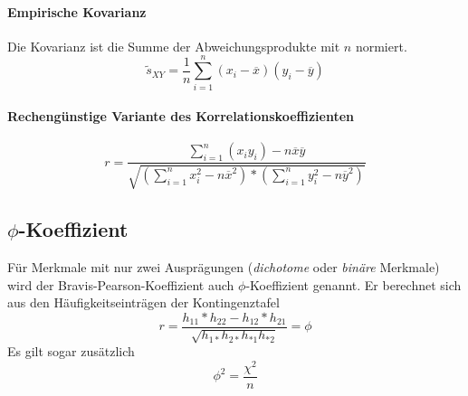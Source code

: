 \paragraph{Empirische Kovarianz}
Die Kovarianz ist die Summe der Abweichungsprodukte mit $n$ normiert.
\begin{equation*}
	\tilde s_{XY}=\frac1n\sum\limits_{i=1}^n (x_i-\overline x)(y_i-\overline y)
\end{equation*}

\paragraph{Rechengünstige Variante des Korrelationskoeffizienten}
\begin{equation*}
	r=\frac{\sum\limits_{i=1}^n (x_iy_i)-n\overline x\overline y}{\sqrt{\left(\sum\limits_{i=1}^n x_i^2 -n\overline x^2\right)*\left(\sum\limits_{i=1}^n y_i^2 -n\overline y^2\right)}}
\end{equation*}

\subsection{$\phi$-Koeffizient}
Für Merkmale mit nur zwei Ausprägungen (\emph{dichotome} oder \emph{binäre} Merkmale) wird der Bravis-Pearson-Koeffizient auch $\phi$-Koeffizient genannt. Er berechnet sich aus den Häufigkeitseinträgen der Kontingenztafel
\begin{equation*}
	r=\frac{h_{11}*h_{22}-h_{12}*h_{21}}{\sqrt{h_{1*}h_{2*}h_{*1}h_{*2}}}=\phi
\end{equation*}
Es gilt sogar zusätzlich
\begin{equation*}
	\phi^2=\frac{\chi^2}{n}
\end{equation*}